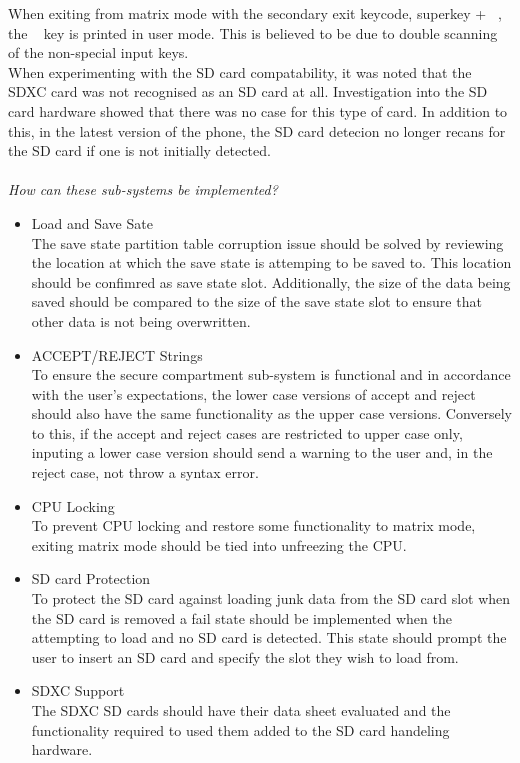 When exiting from matrix mode with the secondary exit keycode, superkey + ~, the ~ key is printed in user mode. This is believed to be due to double scanning of the non-special input keys.\\
When experimenting with the SD card compatability, it was noted that the SDXC card was not recognised as an SD card at all. Investigation into the SD card hardware showed that there was no case for this type of card. In addition to this, in the latest version of the phone, the SD card detecion no longer recans for the SD card if one is not initially detected.\\
\\
\textit{How can these sub-systems be implemented?}\\
\begin{itemize}
\item{Load and Save Sate}\\
  The save state partition table corruption issue should be solved by reviewing the location at which the save state is attemping to be saved to. This location should be confimred as save state slot. Additionally, the size of the data being saved should be compared to the size of the save state slot to ensure that other data is not being overwritten.
\item{ACCEPT/REJECT Strings}\\
  To ensure the secure compartment sub-system is functional and in accordance with the user's expectations, the lower case versions of accept and reject should also have the same functionality as the upper case versions. Conversely to this, if the accept and reject cases are restricted to upper case only, inputing a lower case version should send a warning to the user and, in the reject case, not throw a syntax error.
\item{CPU Locking}\\
  To prevent CPU locking and restore some functionality to matrix mode, exiting matrix mode should be tied into unfreezing the CPU.
\item{SD card Protection}\\
  To protect the SD card against loading junk data from the SD card slot when the SD card is removed a fail state should be implemented when the attempting to load and no SD card is detected. This state should prompt the user to insert an SD card and specify the slot they wish to load from.
\item{SDXC Support}\\
  The SDXC SD cards should have their data sheet evaluated and the functionality required to used them added to the SD card handeling hardware.
\end{itemize}


